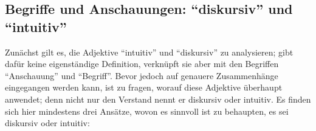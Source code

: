 \subsection[Begriffe und Anschauungen]{Begriffe und Anschauungen:
\enquote{diskursiv} und
\enquote{intuitiv}}\label{subsubsection:BegriffderDiskursivitaet}
Zunächst gilt es, die Adjektive \enquote{intuitiv} und \enquote{diskursiv} zu
analysieren;  gibt dafür keine eigenständige Definition,
verknüpft sie aber mit den Begriffen \enquote{Anschauung} und \enquote{Begriff}.
Bevor jedoch auf genauere Zusammenhänge eingegangen werden kann, ist zu fragen,
worauf  diese Adjektive überhaupt anwendet; denn nicht nur
den Verstand nennt er diskursiv oder intuitiv.
Es finden sich hier mindestens drei Ansätze, wovon es sinnvoll ist zu behaupten,
es sei diskursiv oder intuitiv:
